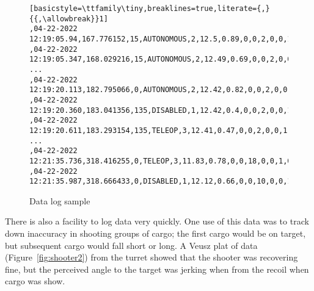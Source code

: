 \documentclass[]{article}
\begin{document}
\begin{itemize}[topsep=0pt]
\begin{figure}[h]
\begin{mdframed}
\begin{lstlisting}[basicstyle=\ttfamily\tiny,breaklines=true,literate={,}{{,\allowbreak}}1]
,04-22-2022 12:19:05.94,167.776152,15,AUTONOMOUS,2,12.5,0.89,0,0,2,0,0,1,0,0,NaN,NaN,NaN,-1.0,-1.0,-0.56,-0.56,0,0,0,24,2.61,85.51,3.72,144.92,2.64,86.63,1.53,-200.33,0,0,0,0,0,0,0,0,-1,0,0,0,-1,0,0,0,-1,-0,0,0,0,-0,0,0,0,0,0,-0,0,0,0,0
,04-22-2022 12:19:05.347,168.029216,15,AUTONOMOUS,2,12.49,0.69,0,0,2,0,0,1,0,0,NaN,NaN,NaN,-1.0,-1.0,-0.56,-0.56,0,0,0,24,2.61,85.51,3.72,144.92,2.64,86.63,1.53,-200.33,0,0,0,0,0,0,0,0,-1,0,0,0,-1,0,0,0,-1,-0,0,0,0,-0,0,0,0,0,0,-0,0,0,0,0
...
,04-22-2022 12:19:20.113,182.795066,0,AUTONOMOUS,2,12.42,0.82,0,0,2,0,0,1,0,0,NaN,NaN,NaN,-1.0,-1.0,-97.6,82.4,180,0,0,24,3.82,-3.91,3.33,173.62,1.45,174.62,3.74,-361.97,0,0,0,0,0,0,0,0,-1,405.47,0,0,0,0,0,0,-1,-0,0,0,23.37,23.21,0.02,0,-0.01,0.22,180,180.08,0,0,0,0
,04-22-2022 12:19:20.360,183.041356,135,DISABLED,1,12.42,0.4,0,0,2,0,0,1,0,0,NaN,NaN,NaN,-1.0,-1.0,-97.6,82.4,180,0,0,24,3.82,-3.91,3.33,173.62,1.45,174.62,3.74,-361.97,0,0,0,0,0,0,0,0,-1,347.75,0,0,0,0,0,0,-1,-0,0,0,23.37,22.98,0,0,0,0,180,180.08,0,0,0,0
,04-22-2022 12:19:20.611,183.293154,135,TELEOP,3,12.41,0.47,0,0,2,0,0,1,0,0,NaN,NaN,NaN,-1.0,-1.0,-97.6,82.4,180,0,0,24,3.82,-3.91,3.33,173.62,1.45,174.62,3.74,-361.97,0,0,0,0,0,0,0,0,-1,302.34,0,0,0,0,0,0,-1,-0,0,0,23.37,20.76,0.03,0,-0.67,0,180,180.08,0,0,0,0
...
,04-22-2022 12:21:35.736,318.416255,0,TELEOP,3,11.83,0.78,0,0,18,0,0,1,0,0,NaN,NaN,NaN,-1.0,-1.0,-718.45,-178.45,180,-0.05,45.59,26,0.05,-449.62,4.47,813.47,0.17,1352.05,4.88,-806.71,0,0,0,0,0,0,0,0,-1,0.59,0,0,0,0,0,0,-1,-0,0,0,2,2.07,-0.01,0,-0,0.16,0,0.03,0,0,0,0
,04-22-2022 12:21:35.987,318.666433,0,DISABLED,1,12.12,0.66,0,0,10,0,0,1,0,0,NaN,NaN,NaN,-1.0,-1.0,-718.05,-178.05,180,0,0,26,0.05,-449.62,4.47,813.47,0.17,1352.05,4.88,-806.71,0,0,0,0,0,0,0,0,-1,0.59,0,0,0,-2.93,0,0,-1,-0,0,0,2,2.07,0,0,0,0,0,0.03,0,0,0,0
\end{lstlisting}
\caption{Data log sample}
\label{fig:datalog}
\end{mdframed}
\end{figure}

\renewcommand\topfraction{0.9}
\renewcommand\bottomfraction{0.9}

There is also a facility to log data very quickly. One use of this data was to track down inaccuracy in shooting groups of cargo; the first cargo would be on target, but subsequent cargo would fall short or long. A Veusz plat of data (Figure~\ref{fig:shooter2}) from the turret showed that the shooter was recovering fine, but the perceived angle to the target was jerking when from the recoil when cargo was show.


\end{itemize}
\end{document}
